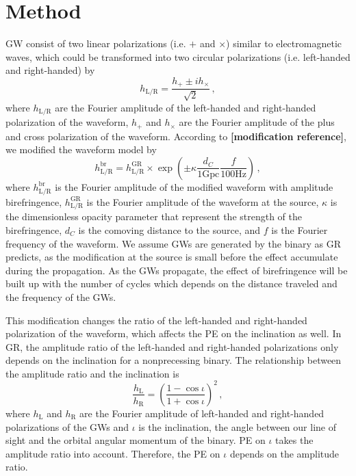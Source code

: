 \documentclass[aps,prd,twocolumn,superscriptaddress,preprintnumbers,floatfix,nofootinbib]{revtex4-2}
\begin{document}
\section{Method}
\label{sec:Method}
GW consist of two linear polarizations (i.e. $+$ and $\times$) similar to electromagnetic waves, which could be transformed into two circular polarizations (i.e. left-handed and right-handed) by
\begin{equation}
    h_{\mathrm{L/R}} = \frac{h_+ \pm i h_\times}{\sqrt{2}}\,,
\end{equation}
where $h_{\mathrm{L/R}}$ are the Fourier amplitude of the left-handed and right-handed polarization of the waveform, $h_+$ and $h_\times$ are the Fourier amplitude of the plus and cross polarization of the waveform.
According to \textbf{[modification reference]}, we modified the waveform model by
\begin{equation}
    h_\mathrm{L/R}^{\mathrm{br}}=
    h_\mathrm{L/R}^{\mathrm{GR}}\times
    \exp\left(\pm\kappa\frac{d_C}{1\mathrm{Gpc}}\frac{f}{100\mathrm{Hz}}\right)\,,
\end{equation}
where $h_\mathrm{L/R}^{\mathrm{br}}$ is the Fourier amplitude of the modified waveform with amplitude birefringence, $h_\mathrm{L/R}^{\mathrm{GR}}$ is the Fourier amplitude of the waveform at the source, $\kappa$ is the dimensionless opacity parameter that represent the strength of the birefringence, $d_C$ is the comoving distance to the source, and $f$ is the Fourier frequency of the waveform.
We assume GWs are generated by the binary as GR predicts, as the modification at the source is small before the effect accumulate during the propagation.
As the GWs propagate, the effect of birefringence will be built up with the number of cycles which depends on the distance traveled and the frequency of the GWs.

This modification changes the ratio of the left-handed and right-handed polarization of the waveform, which affects the PE on the inclination as well.
In GR, the amplitude ratio of the left-handed and right-handed polarizations only depends on the inclination for a nonprecessing binary.
The relationship between the amplitude ratio and the inclination is
\begin{equation}
    \frac{h_\mathrm{L}}{h_\mathrm{R}}=\left(\frac{1-\cos\iota}{1+\cos\iota}\right)^2\,,
\end{equation}
where $h_\mathrm{L}$ and $h_\mathrm{R}$ are the Fourier amplitude of left-handed and right-handed polarizations of the GWs and $\iota$ is the inclination, the angle between our line of sight and the orbital angular momentum of the binary.
PE on $\iota$ takes the amplitude ratio into account. Therefore, the PE on $\iota$ depends on the amplitude ratio.
\end{document}
